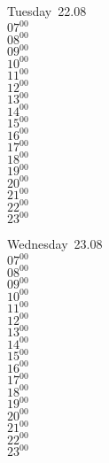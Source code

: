 \documentclass[11pt, a4paper]{book}\usepackage[]{graphicx}\usepackage[]{color}
\begin{document}
\begin{weekdaybox}
  Tuesday~22.08\\
  { 
  \vfill
  $07^{00}$\\
$08^{00}$\\
$09^{00}$\\
$10^{00}$\\
$11^{00}$\\
$12^{00}$\\
$13^{00}$\\
$14^{00}$\\
$15^{00}$\\
$16^{00}$\\
$17^{00}$\\
$18^{00}$\\
$19^{00}$\\
$20^{00}$\\
$21^{00}$\\
$22^{00}$\\
$23^{00}$\\
  }
\end{weekdaybox}
\begin{weekdaybox}
  Wednesday~23.08\\
  { 
  \vfill
  $07^{00}$\\
$08^{00}$\\
$09^{00}$\\
$10^{00}$\\
$11^{00}$\\
$12^{00}$\\
$13^{00}$\\
$14^{00}$\\
$15^{00}$\\
$16^{00}$\\
$17^{00}$\\
$18^{00}$\\
$19^{00}$\\
$20^{00}$\\
$21^{00}$\\
$22^{00}$\\
$23^{00}$\\
  }
\end{weekdaybox}
\clearpage
\begin{headerbox}
\end{headerbox}
\end{document}
